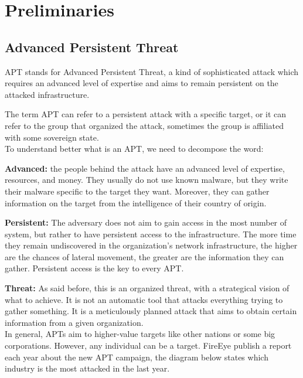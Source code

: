 \chapter{Preliminaries}
\section{Advanced Persistent Threat}

APT stands for Advanced Persistent Threat, a kind of sophisticated attack which requires an advanced level of expertise and aims to remain persistent on the attacked infrastructure.

The term APT can refer to a persistent attack with a specific target, or it can refer to the group that organized the attack, sometimes the group is affiliated with some sovereign state.
\\

To understand better what is an APT, we need to decompose the word: 

\textbf{Advanced:} the people behind the attack have an advanced level of expertise, resources, and money. They usually do not use known malware, but they write their malware specific to the target they want. Moreover, they can gather information on the target from the intelligence of their country of origin.

\textbf{Persistent:}  The adversary does not aim to gain access in the most number of system, but rather to have persistent access to the infrastructure. The more time they remain undiscovered in the organization's network infrastructure, the higher are the chances of lateral movement, the greater are the information they can gather. Persistent access is the key to every APT.

\textbf{Threat:} As said before, this is an organized threat, with a strategical vision of what to achieve. It is not an automatic tool that attacks everything trying to gather something. It is a meticulously planned attack that aims to obtain certain information from a given organization. \cite{apt_def}
\\

In general, APTs aim to higher-value targets like other nations or some big corporations. However, any individual can be a target. FireEye publish a report each year about the new APT campaign, the diagram below states which industry is the most attacked in the last year.\\

